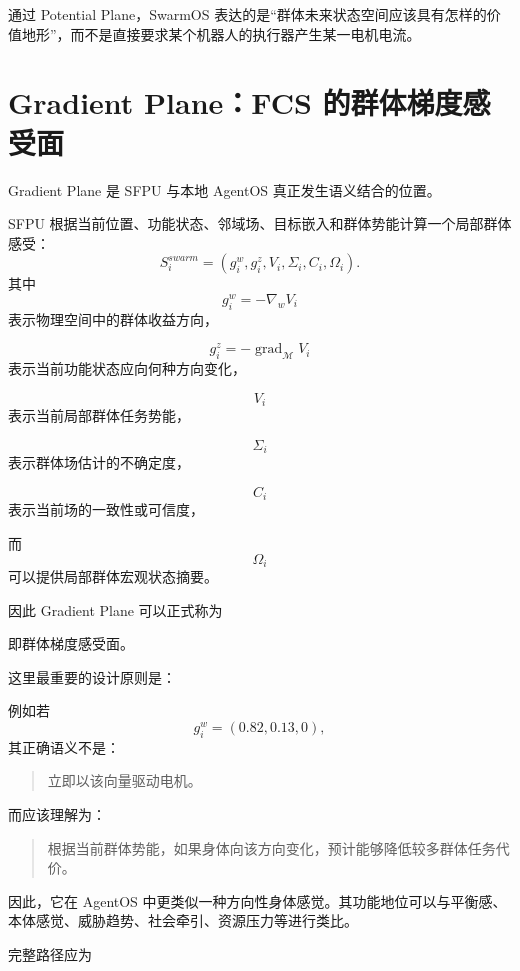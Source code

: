 通过 Potential Plane，SwarmOS 表达的是“群体未来状态空间应该具有怎样的价值地形”，而不是直接要求某个机器人的执行器产生某一电机电流。


\section{Gradient Plane：FCS 的群体梯度感受面}

Gradient Plane 是 SFPU 与本地 AgentOS 真正发生语义结合的位置。

SFPU 根据当前位置、功能状态、邻域场、目标嵌入和群体势能计算一个局部群体感受：
\[
S_i^{swarm}
=
(
g_i^w,
g_i^z,
V_i,
\Sigma_i,
C_i,
\Omega_i
).
\]
其中
\[
g_i^w
=
-\nabla_wV_i
\]
表示物理空间中的群体收益方向，

\[
g_i^z
=
-\operatorname{grad}_{\mathcal M}V_i
\]
表示当前功能状态应向何种方向变化，

\[
V_i
\]
表示当前局部群体任务势能，

\[
\Sigma_i
\]
表示群体场估计的不确定度，

\[
C_i
\]
表示当前场的一致性或可信度，

而
\[
\Omega_i
\]
可以提供局部群体宏观状态摘要。

因此 Gradient Plane 可以正式称为
\begin{statementbox}
\centering
{}
\end{statementbox}
即群体梯度感受面。

这里最重要的设计原则是：
\begin{statementbox}
\centering
{}
\end{statementbox}

例如若
\[
g_i^w
=
(0.82,0.13,0),
\]
其正确语义不是：
\begin{quote}
立即以该向量驱动电机。
\end{quote}
而应该理解为：
\begin{quote}
根据当前群体势能，如果身体向该方向变化，预计能够降低较多群体任务代价。
\end{quote}

因此，它在 AgentOS 中更类似一种方向性身体感觉。其功能地位可以与平衡感、本体感觉、威胁趋势、社会牵引、资源压力等进行类比。

完整路径应为
\begin{statementbox}
\centering
{}
\end{statementbox}


